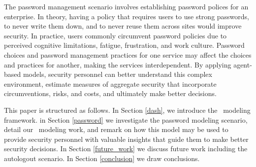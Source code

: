 \documentclass[conference]{IEEEtran}
\begin{document}
The password management scenario involves establishing password
polices for an enterprise. In theory, having a policy that requires users 
to use strong passwords, to never write them down, and to never 
reuse them across sites would improve security.  In practice, users commonly 
circumvent password policies due to perceived cognitive limitations, 
fatigue, frustration, and work culture. Password choices and password 
management practices for one service may affect the choices and 
practices for another, making the services interdependent. By applying 
agent-based models, security personnel can better understand this 
complex environment, estimate measures of aggregate security that 
incorporate circumventions, risks, and costs, and ultimately make 
better decisions.

This paper is structured as follows. In Section \ref{dash}, we 
introduce the \dash\ modeling framework. in Section \ref{password} 
we investigate the password modeling scenario, detail our \dash\ 
modeling work, and remark on how this model may be used to 
provide security personnel with valuable insights that guide them 
to make better security decisions. In Section \ref{future_work} we 
discuss future work including the autologout scenario. In Section 
\ref{conclusion} we draw conclusions.
\end{document}
